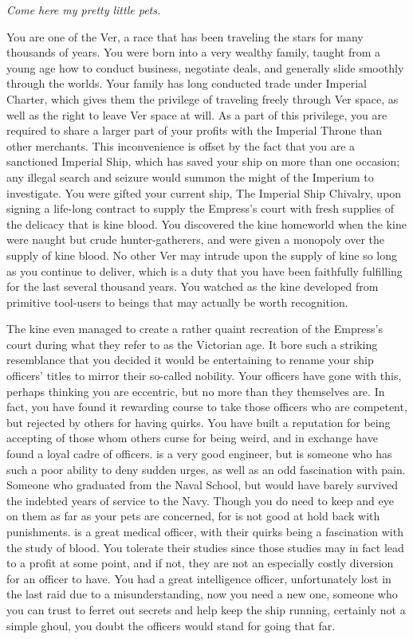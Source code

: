 \documentclass[char]{guildcamp4}
\begin{document}
\name{\cVone{}}


\textit{Come here my pretty little pets.}

You are one of the Ver, a race that has been traveling the stars for many thousands of years. You were born into a very wealthy family, taught from a young age how to conduct business, negotiate deals, and generally slide smoothly through the worlds. Your family has long conducted trade under Imperial Charter, which gives them the privilege of traveling freely through Ver space, as well as the right to leave Ver space at will. As a part of this privilege, you are required to share a larger part of your profits with the Imperial Throne than other merchants. This inconvenience is offset by the fact that you are a sanctioned Imperial Ship, which has saved your ship on more than one occasion; any illegal search and seizure would summon the might of the Imperium to investigate. You were gifted your current ship, The Imperial Ship Chivalry, upon signing a life-long contract to supply the Empress's court with fresh supplies of the delicacy that is kine blood. You discovered the kine homeworld when the kine were naught but crude hunter-gatherers, and were given a monopoly over the supply of kine blood. No other Ver may intrude upon the supply of kine so long as you continue to deliver, which is a duty that you have been faithfully fulfilling for the last several thousand years. You watched as the kine developed from primitive tool-users to beings that may actually be worth recognition. 

The kine even managed to create a rather quaint recreation of the Empress's court during what they refer to as the Victorian age. It bore such a striking resemblance that you decided it would be entertaining to rename your ship officers' titles to mirror their so-called nobility. Your officers have gone with this, perhaps thinking you are eccentric, but no more than they themselves are. In fact, you have found it rewarding course to take those officers who are competent, but rejected by others for having quirks. You have built a reputation for being accepting of those whom others curse for being weird, and in exchange have found a loyal cadre of officers.\cVtwo{} is a very good engineer, but is someone who has such a poor ability to deny sudden urges, as well as an odd fascination with pain. Someone who graduated from the Naval School, but would have barely survived the indebted years of service to the Navy. Though you do need to keep and eye on them as far as your pets are concerned, for \cVtwo{} is not good at hold back with punishments. \cVthree{} is a great medical officer, with their quirks being a fascination with the study of blood. You tolerate their studies since those studies may in fact lead to a profit at some point, and if not, they are not an especially costly diversion for an officer to have. You had a great intelligence officer, unfortunately lost in the last raid due to a misunderstanding, now you need a new one, someone who you can trust to ferret out secrets and help keep the ship running, certainly not a simple ghoul, you doubt the officers would stand for going that far.
\end{document}
